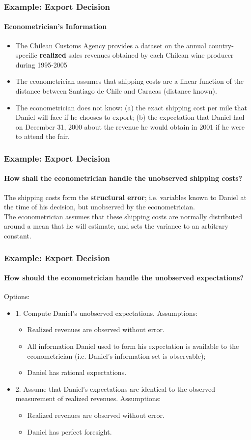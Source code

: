 \documentclass[notes=show]{beamer}
\begin{document}
\begin{frame}
\frametitle{Example: Export Decision}
\framesubtitle{Econometrician's Information}
\begin{itemize}
\item The Chilean Customs Agency provides a dataset on the annual country-specific \textbf{realized} sales revenues obtained by each Chilean wine producer during 1995-2005
\item The econometrician assumes that shipping costs are a linear function of the distance between Santiago de Chile and Caracas (distance known).
\item The econometrician does not know: (a) the exact shipping cost per mile that Daniel will face if he chooses to export; (b) the expectation that Daniel had on December 31, 2000 about the revenue he would obtain in 2001 if he were to attend the fair.
\end{itemize}
\end{frame}
\begin{frame}
\frametitle{Example: Export Decision}
\framesubtitle{How shall the econometrician handle the unobserved shipping costs?}

The shipping costs form the \textbf{structural error}; i.e. variables known to Daniel at the time of his decision, but unobserved by the econometrician.\\
\bigskip
The econometrician assumes that these shipping costs are normally distributed around a mean that he will estimate, and sets the variance to an arbitrary constant.
\end{frame}
\begin{frame}
\frametitle{Example: Export Decision}
\framesubtitle{How should the econometrician handle the unobserved expectations?}

Options:
\begin{itemize}
	\item 1. Compute Daniel's unobserved expectations. Assumptions:
	\begin{itemize}
		\item Realized revenues are observed without error.
		\item All information Daniel used to form his expectation is available to the econometrician (i.e. Daniel's information set is observable); 
		\item Daniel has rational expectations.
	\end{itemize}
	\pause
	\item 2. Assume that Daniel's expectations are identical to the observed measurement of realized revenues. Assumptions:
	\begin{itemize}	
		\item Realized revenues are observed without error.
		\item Daniel has perfect foresight.
	\end{itemize}
\end{itemize}
\end{frame}
\end{document}
